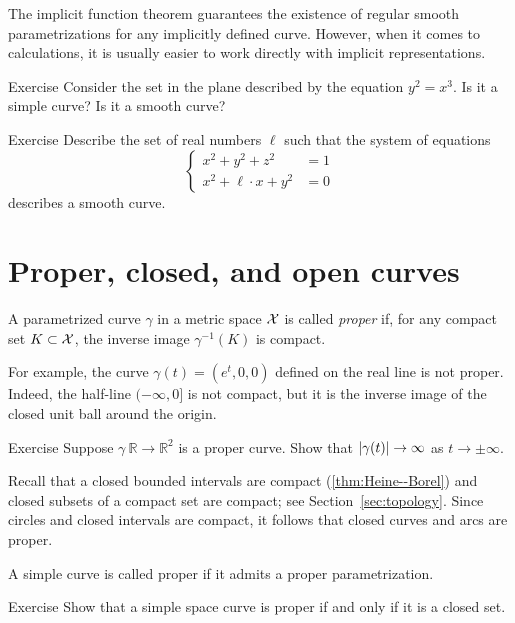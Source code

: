 The implicit function theorem guarantees the existence of regular smooth parametrizations for any implicitly defined curve.
However, when it comes to calculations, it is usually easier to work directly with implicit representations. 

\begin{thm}{Exercise}\label{ex:y^2=x^3}
Consider the set in the plane described by the equation
$y^2=x^3$.
Is it a simple curve?
Is it a smooth curve?
\end{thm}

\begin{thm}{Exercise}\label{ex:viviani}
Describe the set of real numbers $\ell$
such that the system of equations
\[\begin{cases}
x^2+y^2+z^2&=1
\\
x^2+\ell\cdot x+y^2&=0
\end{cases}\]
describes a smooth curve.
\end{thm}

\section{Proper, closed, and open curves}\label{sec:proper-curves}

A parametrized curve $\gamma$ in a metric space $\mathcal{X}$ is called \emph{proper} if, for any compact set $K \subset \mathcal{X}$, the inverse image $\gamma^{-1}(K)$ is compact.

For example, the curve $\gamma(t)=(e^t,0,0)$ defined on the real line is not proper.
Indeed, the half-line $(-\infty,0]$ is not compact, but it is the inverse image of the closed unit ball around the origin.

\begin{thm}{Exercise}\label{ex:open-curve}
Suppose $\gamma\:\mathbb{R}\to\mathbb{R}^2$ is a proper curve.
Show that  $|\gamma(t)|\z\to\infty$ as $t\to\pm\infty$.
\end{thm}


Recall that a closed bounded intervals are compact (\ref{thm:Heine--Borel}) and closed subsets of a compact set are compact;
see Section~\ref{sec:topology}.
Since circles and closed intervals are compact,
it follows that closed curves and arcs are proper.

A simple curve is called proper if it admits a proper parametrization.

\begin{thm}{Exercise}\label{ex:proper-closed}
Show that a simple space curve is proper if and only if it is a closed set.

\end{thm}

